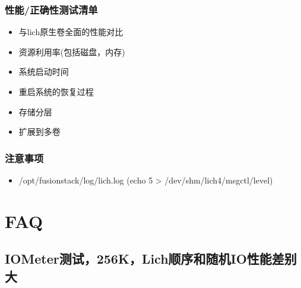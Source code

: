\documentclass[UTF8]{ctexart}
\begin{document}
\subsubsection{性能/正确性测试清单}

\begin{itemize}
    \item 与lich原生卷全面的性能对比
    \item 资源利用率(包括磁盘，内存)
    \item 系统启动时间
    \item 重启系统的恢复过程
    \item 存储分层
    \item 扩展到多卷
\end{itemize}

\subsubsection{注意事项}

\begin{itemize}
    \item /opt/fusionstack/log/lich.log (echo 5 > /dev/shm/lich4/msgctl/level)
\end{itemize}


\section{FAQ}

\subsection{IOMeter测试，256K，Lich顺序和随机IO性能差别大}
\end{document}
